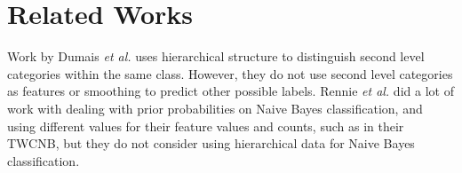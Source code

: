 \section{Related Works}

Work by Dumais \emph{et al.} \cite{dumais2000hierarchical} uses hierarchical structure to distinguish second level categories within the same class. However, they do not use second level categories as features or smoothing to predict other possible labels. Rennie \emph{et al.} \cite{rennie2003tackling} did a lot of work with dealing with prior probabilities on Naive Bayes classification, and using different values for their feature values and counts, such as in their TWCNB, but they do not consider using hierarchical data for Naive Bayes classification. 